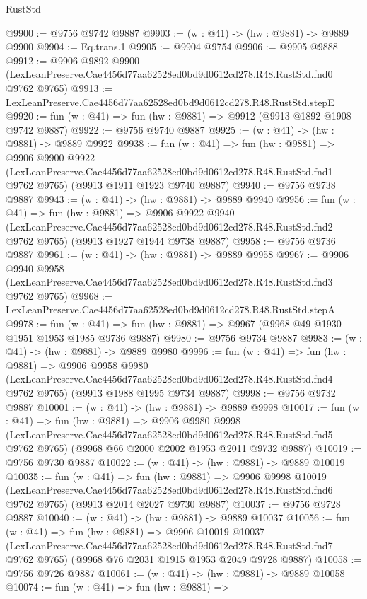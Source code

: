 \begin{lexlean}{RustStd}
\begin{coremodule}
@9900 := @9756 @9742 @9887
@9903 := (w : @41) -> (hw : @9881) -> @9889 @9900
@9904 := Eq.trans.{1}
@9905 := @9904 @9754
@9906 := @9905 @9888
@9912 := @9906
    @9892
    @9900
    (LexLeanPreserve.Cae4456d77aa62528ed0bd9d0612cd278.R48.RustStd.fnd0 @9762 @9765)
@9913 := LexLeanPreserve.Cae4456d77aa62528ed0bd9d0612cd278.R48.RustStd.stepE
@9920 := fun (w : @41) => fun (hw : @9881) => @9912 (@9913 @1892 @1908 @9742 @9887)
@9922 := @9756 @9740 @9887
@9925 := (w : @41) -> (hw : @9881) -> @9889 @9922
@9938 := fun (w : @41) =>
  fun (hw : @9881) =>
  @9906
    @9900
    @9922
    (LexLeanPreserve.Cae4456d77aa62528ed0bd9d0612cd278.R48.RustStd.fnd1 @9762 @9765)
    (@9913 @1911 @1923 @9740 @9887)
@9940 := @9756 @9738 @9887
@9943 := (w : @41) -> (hw : @9881) -> @9889 @9940
@9956 := fun (w : @41) =>
  fun (hw : @9881) =>
  @9906
    @9922
    @9940
    (LexLeanPreserve.Cae4456d77aa62528ed0bd9d0612cd278.R48.RustStd.fnd2 @9762 @9765)
    (@9913 @1927 @1944 @9738 @9887)
@9958 := @9756 @9736 @9887
@9961 := (w : @41) -> (hw : @9881) -> @9889 @9958
@9967 := @9906
    @9940
    @9958
    (LexLeanPreserve.Cae4456d77aa62528ed0bd9d0612cd278.R48.RustStd.fnd3 @9762 @9765)
@9968 := LexLeanPreserve.Cae4456d77aa62528ed0bd9d0612cd278.R48.RustStd.stepA
@9978 := fun (w : @41) => fun (hw : @9881) => @9967 (@9968 @49 @1930 @1951 @1953 @1985 @9736 @9887)
@9980 := @9756 @9734 @9887
@9983 := (w : @41) -> (hw : @9881) -> @9889 @9980
@9996 := fun (w : @41) =>
  fun (hw : @9881) =>
  @9906
    @9958
    @9980
    (LexLeanPreserve.Cae4456d77aa62528ed0bd9d0612cd278.R48.RustStd.fnd4 @9762 @9765)
    (@9913 @1988 @1995 @9734 @9887)
@9998 := @9756 @9732 @9887
@10001 := (w : @41) -> (hw : @9881) -> @9889 @9998
@10017 := fun (w : @41) =>
  fun (hw : @9881) =>
  @9906
    @9980
    @9998
    (LexLeanPreserve.Cae4456d77aa62528ed0bd9d0612cd278.R48.RustStd.fnd5 @9762 @9765)
    (@9968 @66 @2000 @2002 @1953 @2011 @9732 @9887)
@10019 := @9756 @9730 @9887
@10022 := (w : @41) -> (hw : @9881) -> @9889 @10019
@10035 := fun (w : @41) =>
  fun (hw : @9881) =>
  @9906
    @9998
    @10019
    (LexLeanPreserve.Cae4456d77aa62528ed0bd9d0612cd278.R48.RustStd.fnd6 @9762 @9765)
    (@9913 @2014 @2027 @9730 @9887)
@10037 := @9756 @9728 @9887
@10040 := (w : @41) -> (hw : @9881) -> @9889 @10037
@10056 := fun (w : @41) =>
  fun (hw : @9881) =>
  @9906
    @10019
    @10037
    (LexLeanPreserve.Cae4456d77aa62528ed0bd9d0612cd278.R48.RustStd.fnd7 @9762 @9765)
    (@9968 @76 @2031 @1915 @1953 @2049 @9728 @9887)
@10058 := @9756 @9726 @9887
@10061 := (w : @41) -> (hw : @9881) -> @9889 @10058
@10074 := fun (w : @41) =>
  fun (hw : @9881) =>

\end{coremodule}
\end{lexlean}
